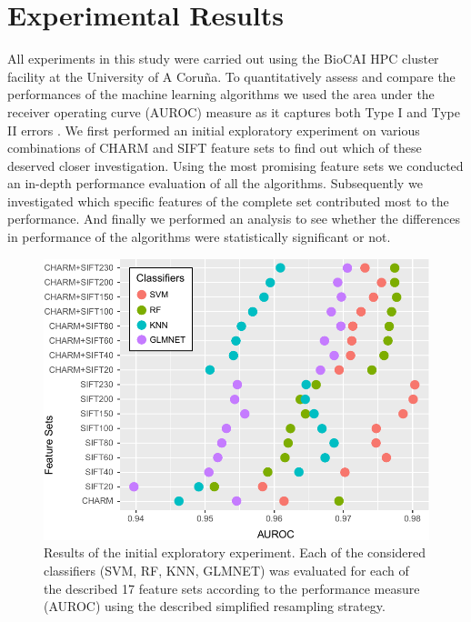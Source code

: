 \section{Experimental Results}
\label{sec:experimental-results}

All experiments in this study were carried out using the BioCAI HPC cluster facility at the University of A Coru\~{n}a. To quantitatively assess and compare the performances of the machine learning algorithms we used the area under the receiver operating curve (AUROC) measure as it captures both Type I and Type II errors \cite{Fawcett:2006:IRA:1159473.1159475}. We first performed an initial exploratory experiment on various combinations of CHARM and SIFT feature sets to find out which of these deserved closer investigation. Using the most promising feature sets we conducted an in-depth performance evaluation of all the algorithms. Subsequently we investigated which specific features of the complete set contributed most to the performance. And finally we performed an analysis to see whether the differences in performance of the algorithms were statistically significant or not.

\begin{figure}
	\centering
	\includegraphics[width=\columnwidth]{fig04}
	\caption{Results of the initial exploratory experiment. Each of the considered classifiers (SVM, RF, KNN, GLMNET) was evaluated for each of the described 17 feature sets according to the performance measure (AUROC) using the described simplified resampling strategy.}
	\label{fig:initialResults}
\end{figure}


